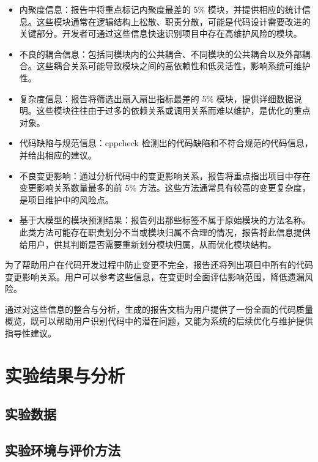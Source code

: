 \begin{itemize}
    \item 内聚度信息：报告中将重点标记内聚度最差的 5\% 模块，并提供相应的统计信息。这些模块通常在逻辑结构上松散、职责分散，可能是代码设计需要改进的关键部分。开发者可通过这些信息快速识别项目中存在高维护风险的模块。
    
    \item 不良的耦合信息：包括同模块内的公共耦合、不同模块的公共耦合以及外部耦合。这些耦合关系可能导致模块之间的高依赖性和低灵活性，影响系统可维护性。
    
    \item 复杂度信息：报告将筛选出扇入扇出指标最差的 5\% 模块，提供详细数据说明。这些模块往往由于过多的依赖关系或调用关系而难以维护，是优化的重点对象。
    
    \item 代码缺陷与规范信息：cppcheck 检测出的代码缺陷和不符合规范的代码信息，并给出相应的建议。
    
    \item 不良变更影响：通过分析代码中的变更影响关系，报告将重点指出项目中存在变更影响关系数量最多的前 5\% 方法。这些方法通常具有较高的变更复杂度，是项目维护中的风险点。
    
    \item 基于大模型的模块预测结果：报告列出那些标签不属于原始模块的方法名称。此类方法可能存在职责划分不当或模块归属不合理的情况，报告将此信息提供给用户，供其判断是否需要重新划分模块归属，从而优化模块结构。
\end{itemize}

为了帮助用户在代码开发过程中防止变更不完全，报告还将列出项目中所有的代码变更影响关系。用户可以参考这些信息，在变更时全面评估影响范围，降低遗漏风险。

通过对这些信息的整合与分析，生成的报告文档为用户提供了一份全面的代码质量概览，既可以帮助用户识别代码中的潜在问题，又能为系统的后续优化与维护提供指导性建议。

\section{实验结果与分析}

\subsection{实验数据}



\subsection{实验环境与评价方法}

